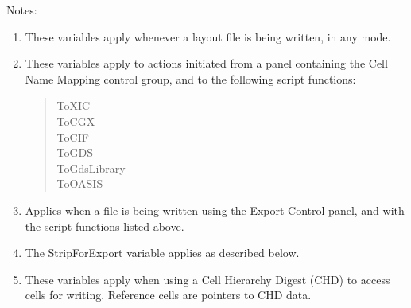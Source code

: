 Notes:
\begin{enumerate}
\item{These variables apply whenever a layout file is being written,
in any mode.}

\item{These variables apply to actions initiated from a panel
containing the {\cb Cell Name Mapping} control group, and to the
following script functions:
\begin{quote}
{\vt ToXIC}\\
{\vt ToCGX}\\
{\vt ToCIF}\\
{\vt ToGDS}\\
{\vt ToGdsLibrary}\\
{\vt ToOASIS}
\end{quote}}

\item{Applies when a file is being written using the {\cb Export
Control} panel, and with the script functions listed above.}

\item{The {\et StripForExport} variable applies as described below.}

\item{These variables apply when using a Cell Hierarchy Digest (CHD)
to access cells for writing.  Reference cells are pointers to CHD
data.}
\end{enumerate}

